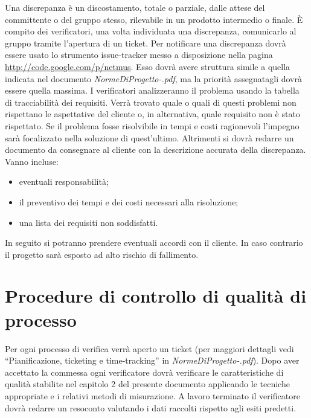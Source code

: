 Una discrepanza \`e un discostamento, totale o parziale, dalle attese del
committente o del gruppo stesso, rilevabile in un prodotto intermedio
o finale. \`E compito dei verificatori, una volta individuata una discrepanza,
comunicarlo al gruppo tramite l'apertura di un ticket. Per notificare una
discrepanza dovr\`a essere usato lo strumento issue-tracker messo a disposizione nella pagina \url{http://code.google.com/p/netmus}. 
Esso dovr\`a avere struttura simile a quella indicata nel
documento \emph{NormeDiProgetto-\versionenormeprogetto.pdf}, ma la priorit\`a assegnatagli dovr\`a essere quella
massima. I verificatori analizzeranno il problema usando la tabella di
tracciabilit\`a dei requisiti. Verr\`a trovato quale o quali di questi problemi non
rispettano le aspettative del cliente o, in alternativa, quale requisito non \`e
stato rispettato. Se il problema fosse risolvibile in tempi e costi ragionevoli
l'impegno sar\`a focalizzato nella soluzione di quest'ultimo. Altrimenti si dovr\`a
redarre un documento da consegnare al cliente con la descrizione accurata della
discrepanza.\\

Vanno incluse:

\begin{itemize}

\item eventuali responsabilit\`a;
\item il preventivo dei tempi e dei costi necessari alla risoluzione;
\item una lista dei requisiti non soddisfatti.

\end{itemize}

In seguito si potranno prendere eventuali accordi con il cliente. In caso
contrario il progetto sar\`a esposto ad alto rischio di fallimento.

\section{Procedure di controllo di qualit\`a di processo}
Per ogni processo di verifica verr\`a aperto un ticket (per maggiori dettagli vedi
``Pianificazione, ticketing e time-tracking'' in \emph{NormeDiProgetto-\versionenormeprogetto.pdf}). Dopo aver
accettato la commessa ogni verificatore dovr\`a verificare le caratteristiche di
qualit\`a stabilite nel capitolo 2 del presente documento applicando le tecniche
appropriate e i relativi metodi di misurazione. A lavoro terminato il
verificatore dovr\`a redarre un resoconto valutando i dati raccolti rispetto agli
esiti predetti.

